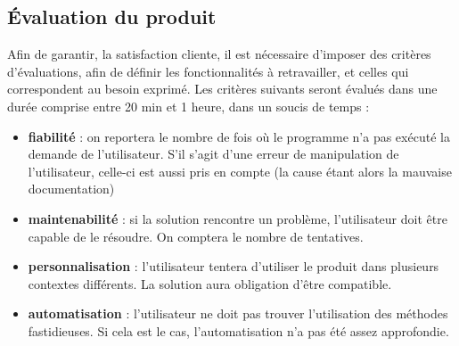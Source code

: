 \documentclass[french,12pt]{report}
\begin{document}
\begin{normalsize}
 \section{Évaluation du produit}
 Afin de garantir, la satisfaction cliente, il est nécessaire d’imposer des critères d’évaluations, afin de définir les fonctionnalités à retravailler, et celles qui correspondent au besoin exprimé. Les critères suivants seront évalués dans une durée comprise entre 20 min et 1 heure, dans un soucis de temps :
 
       \begin{itemize}
\item \textbf{fiabilité} : on reportera le nombre de fois où le programme n’a pas exécuté la demande de   l’utilisateur. S’il s’agit d’une erreur de manipulation de l’utilisateur, celle-ci est aussi pris en compte (la cause étant alors la mauvaise documentation)
\item \textbf{maintenabilité} : si la solution rencontre un problème, l’utilisateur doit être capable de le résoudre. On comptera le nombre de tentatives.
\item \textbf{personnalisation} : l’utilisateur tentera d’utiliser le produit dans plusieurs contextes différents. La solution aura obligation d’être compatible.
\item \textbf{automatisation} : l’utilisateur ne doit pas trouver l’utilisation des méthodes fastidieuses. Si cela est le cas, l’automatisation n’a pas été assez approfondie.
\end{itemize}

\end{normalsize}
\end{document}
